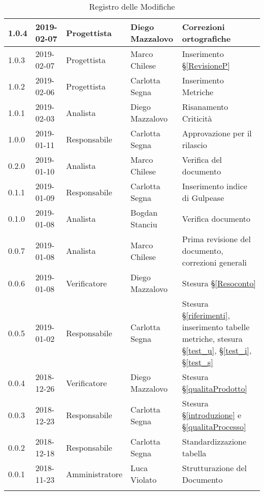 \begin{center}
\begin{longtable}[c]{|m{}|m{}|m{}|m{}|p{}|}
\hline
1.0.4 & 2019-02-07 & Progettista & Diego Mazzalovo & Correzioni ortografiche \\
\hline
\rowcolor{grigio} 1.0.3 & 2019-02-07 & Progettista & Marco Chilese & Inserimento §\ref{RevisioneP} \\
\hline
1.0.2 & 2019-02-06 & Progettista & Carlotta Segna & Inserimento Metriche \\
\hline
\rowcolor{grigio}1.0.1 & 2019-02-03 & Analista & Diego Mazzalovo & Risanamento Criticità \\
\hline 
1.0.0 & 2019-01-11 & Responsabile & Carlotta Segna & Approvazione per il rilascio\\
\hline
\rowcolor{grigio}0.2.0 & 2019-01-10 & Analista & Marco Chilese & Verifica del documento\\
\hline
0.1.1 & 2019-01-09 & Responsabile & Carlotta Segna & Inserimento indice di Gulpease \\
\hline
\rowcolor{grigio}0.1.0 & 2019-01-08 &  Analista & Bogdan Stanciu & Verifica documento \\
\hline
0.0.7 & 2019-01-08 & Analista & Marco Chilese & Prima revisione del documento, correzioni generali\\
\hline
\rowcolor{grigio}0.0.6 & 2019-01-08 & Verificatore & Diego Mazzalovo & Stesura §\ref{Resoconto}\\
\hline
0.0.5 & 2019-01-02 & Responsabile & Carlotta Segna & Stesura §\ref{riferimenti}, inserimento tabelle metriche, stesura §\ref{test_u}, §\ref{test_i}, §\ref{test_s} \\
\hline
\rowcolor{grigio} 0.0.4 & 2018-12-26 & Verificatore & Diego Mazzalovo  & Stesura §\ref{qualitaProdotto} \\
\hline
0.0.3 & 2018-12-23 & Responsabile  & Carlotta Segna & Stesura §\ref{introduzione} e §\ref{qualitaProcesso} \\
\hline
\rowcolor{grigio} 0.0.2 & 2018-12-18 & Responsabile & Carlotta Segna & Standardizzazione tabella \\
\hline
0.0.1 & 2018-11-23 & Amministratore & Luca Violato & Strutturazione del Documento \\

\hline
\caption{Registro delle Modifiche}
\end{longtable}
\end{center}